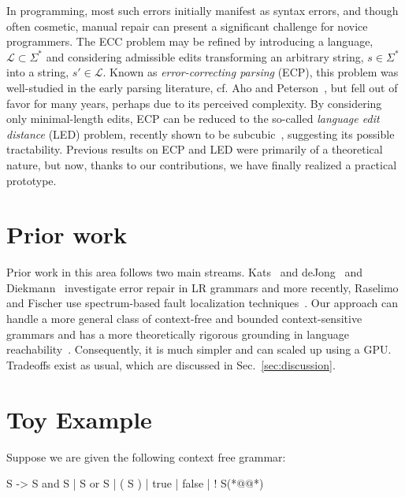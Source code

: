 \documentclass[sigplan,nonacm]{acmart}\settopmatter{printfolios=false,printccs=false,printacmref=false}
\begin{document}
In programming, most such errors initially manifest as syntax errors, and though often cosmetic, manual repair can present a significant challenge for novice programmers. The ECC problem may be refined by introducing a language, $\mathcal{L} \subset \Sigma^*$ and considering admissible edits transforming an arbitrary string, $s \in \Sigma^*$ into a string, $s'\in\mathcal{L}$. Known as \textit{error-correcting parsing} (ECP), this problem was well-studied in the early parsing literature, cf. Aho and Peterson~\cite{aho1972minimum}, but fell out of favor for many years, perhaps due to its perceived complexity. By considering only minimal-length edits, ECP can be reduced to the so-called \textit{language edit distance} (LED) problem, recently shown to be subcubic~\cite{bringmann2019truly}, suggesting its possible tractability. Previous results on ECP and LED were primarily of a theoretical nature, but now, thanks to our contributions, we have finally realized a practical prototype.

\section{Prior work}

Prior work in this area follows two main streams. Kats~\cite{kats2009providing} and deJong~\cite{de2012automated} and Diekmann~\cite{diekmann2018dont} investigate error repair in LR grammars and more recently, Raselimo and Fischer use spectrum-based fault localization techniques~\cite{raselimo2021automatic}. Our approach can handle a more general class of context-free and bounded context-sensitive grammars and has a more theoretically rigorous grounding in language reachability~\cite{melski1997interconvertbility}. Consequently, it is much simpler and can scaled up using a GPU. Tradeoffs exist as usual, which are discussed in Sec.~\ref{sec:discussion}.

\section{Toy Example}

Suppose we are given the following context free grammar:

\begin{tidyinput}
S -> S and S | S or S | ( S ) | true | false | ! S(*@\caret{ }@*)
\end{tidyinput}

\end{document}
